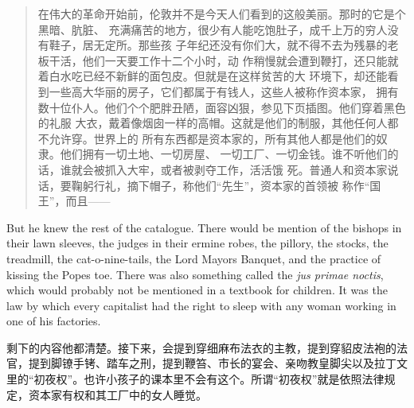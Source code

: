 \begin{paracol}{2}
\begin{quotation}
在伟大的革命开始前，伦敦并不是今天人们看到的这般美丽。那时的它是个黑暗、肮脏、
充满痛苦的地方，很少有人能吃饱肚子，成千上万的穷人没有鞋子，居无定所。那些孩
子年纪还没有你们大，就不得不去为残暴的老板干活，他们一天要工作十二个小时，动
作稍慢就会遭到鞭打，还只能就着白水吃已经不新鲜的面包皮。但就是在这样贫苦的大
环境下，却还能看到一些高大华丽的房子，它们都属于有钱人，这些人被称作资本家，
拥有数十位仆人。他们个个肥胖丑陋，面容凶狠，参见下页插图。他们穿着黑色的礼服
大衣，戴着像烟囱一样的高帽。这就是他们的制服，其他任何人都不允许穿。世界上的
所有东西都是资本家的，所有其他人都是他们的奴隶。他们拥有一切土地、一切房屋、
一切工厂、一切金钱。谁不听他们的话，谁就会被抓入大牢，或者被剥夺工作，活活饿
死。普通人和资本家说话，要鞠躬行礼，摘下帽子，称他们``先生''，资本家的首领被
称作``国王''，而且——
\end{quotation}

\switchcolumn*

But he knew the rest of the catalogue. There would be mention of the
bishops in their lawn sleeves, the judges in their ermine robes, the
pillory, the stocks, the treadmill, the
cat-o\textquotesingle-nine-tails, the Lord Mayor\textquotesingle s
Banquet, and the practice of kissing the Pope\textquotesingle s toe.
There was also something called the \emph{jus primae noctis}, which
would probably not be mentioned in a textbook for children. It was the
law by which every capitalist had the right to sleep with any woman
working in one of his factories.

\switchcolumn


剩下的内容他都清楚。接下来，会提到穿细麻布法衣的主教，提到穿貂皮法袍的法官，提到脚镣手铐、踏车之刑，提到鞭笞、市长的宴会、亲吻教皇脚尖以及拉丁文里的``初夜权''。也许小孩子的课本里不会有这个。所谓``初夜权''就是依照法律规定，资本家有权和其工厂中的女人睡觉。

\switchcolumn*


\end{paracol}
